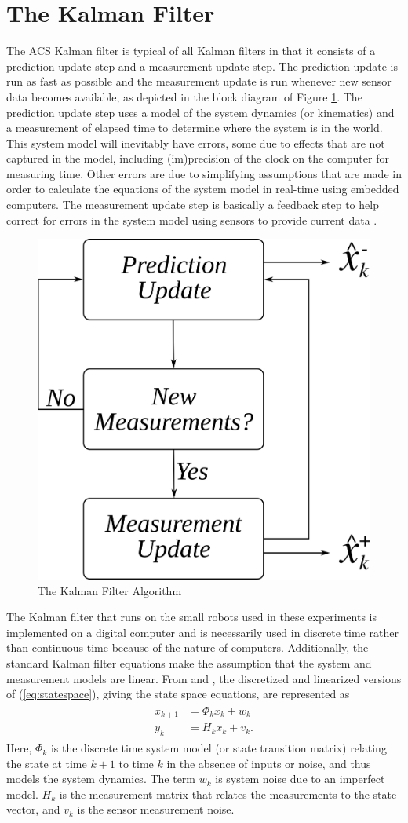 \section{The Kalman Filter}
\label{sec:kalmanfilter}
The ACS Kalman filter is typical of all Kalman filters in that it consists of a prediction update step and a measurement update step. The prediction update is run as fast as possible and the measurement update is run whenever new sensor data becomes available, as depicted in the block diagram of Figure \ref{fig:kf}. The prediction update step uses a model of the system dynamics (or kinematics) and a measurement of elapsed time to determine where the system is in the world. This system model will inevitably have errors, some due to effects that are not captured in the model, including (im)precision of the clock on the computer for measuring time. Other errors are due to simplifying assumptions that are made in order to calculate the equations of the system model in real-time using embedded computers. The measurement update step is basically a feedback step to help correct for errors in the system model using sensors to provide current data \cite{Kelly_1994_338}.

\begin{figure}[ht!]
	\centering
	\includegraphics[width=.4\textwidth]{images/kf}
	\caption{The Kalman Filter Algorithm}
	\label{fig:kf}
\end{figure}

The Kalman filter that runs on the small robots used in these experiments is implemented on a digital computer and is necessarily used in discrete time rather than continuous time because of the nature of computers. Additionally, the standard Kalman filter equations make the assumption that the system and measurement models are linear. From \cite{Kelly_1994_338} and \cite{Simon06OptimalEstimation}, the discretized and linearized versions of (\ref{eq:statespace}), giving the state space equations, are represented as
\begin{align*}
\begin{split}
x_{k+1} &= \Phi_kx_k + w_k \\
y_k &= H_kx_k + v_k.
\end{split}
\end{align*}
Here, $\Phi_k$ is the discrete time system model (or state transition matrix) relating the state at time $k+1$ to time $k$ in the absence of inputs or noise, and thus models the system dynamics. The term $w_k$ is system noise due to an imperfect model. $H_k$ is the measurement matrix that relates the measurements to the state vector, and $v_k$ is the sensor measurement noise.

